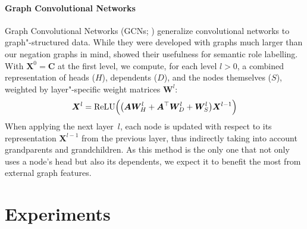 \documentclass[11pt,a4paper]{article}
\let\vec=\mathbold
\theoremstyle{plain}
\begin{document}
\paragraph{Graph Convolutional Networks}

Graph Convolutional Networks (GCNs; \citealp{kipf2017semisupervised})
generalize convolutional networks to graph"-structured data.
While they were developed with graphs much larger than our negation
graphs in mind, \citet{marcheggiani2017encoding} showed their
usefulness for semantic role labelling.
With $\vec{X}^0 = \vec{C}$ at the first level, we compute, for each
level $l > 0$, a combined representation of heads ($H$), dependents
($D$), and the nodes themselves ($S$), weighted by layer"-specific
weight matrices $\vec{W}^l$:
\begin{align*}
  \vec{X}^{l} = \text{ReLU} \Bigl( \bigl( \vec{A} \vec{W}_H^{l} + \vec{A}^\top \vec{W}_D^{l} + \vec{W}_S^{l} \bigr) \vec{X}^{l-1} \Bigr)
\end{align*}
When applying the next layer~$l$, each node is updated with respect to
its representation $\vec{X}^{l-1}$ from the previous layer, thus
indirectly taking into account grandparents and grandchildren.
As this method is the only one that not only uses a node's head but
also its dependents, we expect it to benefit the most from external
graph features.

\section{Experiments}
\label{sec:experiments}
\end{document}

